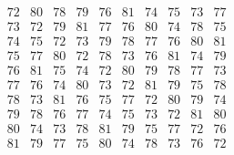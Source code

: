 \documentclass[11pt,a4paper]{amsart}
\begin{document}
\begin{align*}
\begin{array}{r||c|c|c|c|c|c}
\begin{array}{r}
    \end{array}
    &&&&&&
\begin{array}{rrrrrrrrrr}%
72&80&78&79&76&81&74&75&73&77\\%
73&72&79&81&77&76&80&74&78&75\\%
74&75&72&73&79&78&77&76&80&81\\%
75&77&80&72&78&73&76&81&74&79\\%
76&81&75&74&72&80&79&78&77&73\\%
77&76&74&80&73&72&81&79&75&78\\%
78&73&81&76&75&77&72&80&79&74\\%
79&78&76&77&74&75&73&72&81&80\\%
80&74&73&78&81&79&75&77&72&76\\%
81&79&77&75&80&74&78&73&76&72\\%
\end{array}%
  \end{array}
\end{align*}
\end{document}

